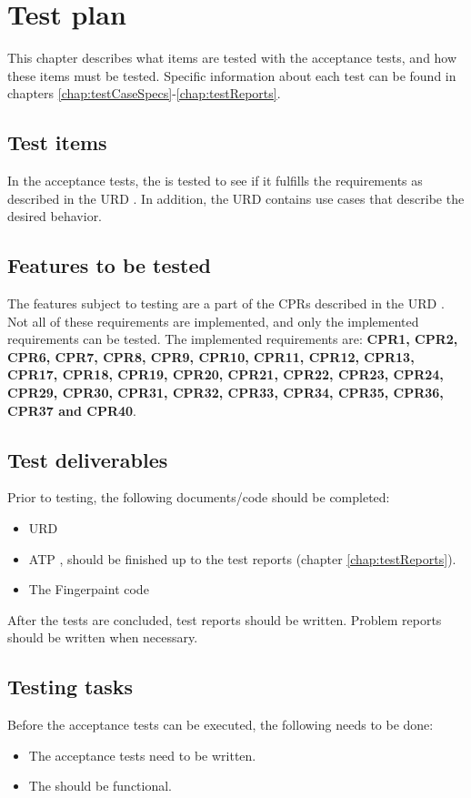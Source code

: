 \chapter{Test plan}
\label{chap:testPlan}
This chapter describes what items are tested with the acceptance tests, and how these items must be tested. Specific information about each test can be found in chapters \ref{chap:testCaseSpecs}-\ref{chap:testReports}.

\section{Test items}
In the acceptance tests, the \applicationname{} is tested to see if it fulfills the requirements as described in the URD \cite{urd}. In addition, the URD \cite{urd} contains use cases that describe the desired behavior.

\section{Features to be tested}
The features subject to testing are a part of the CPRs described in the URD \cite{urd}. Not all of these requirements are implemented, and only the implemented requirements can be tested. The implemented requirements are: \textbf{CPR1, CPR2, CPR6, CPR7, CPR8, CPR9, CPR10, CPR11, CPR12, CPR13, CPR17, CPR18, CPR19, CPR20, CPR21, CPR22, CPR23, CPR24, CPR29, CPR30, CPR31, CPR32, CPR33, CPR34, CPR35, CPR36, CPR37 and CPR40}.

\section{Test deliverables}
Prior to testing, the following documents/code should be completed:
\begin{itemize}
\item URD \cite{urd}
\item ATP \cite{atp}, should be finished up to the test reports (chapter \ref{chap:testReports}).
\item The Fingerpaint code
\end{itemize}
After the tests are concluded, test reports should be written. Problem reports should be written when necessary.

\section{Testing tasks}
Before the acceptance tests can be executed, the following needs to be done:
\begin{itemize}
\item The acceptance tests need to be written.
\item The \applicationname{} should be functional.
\end{itemize}


